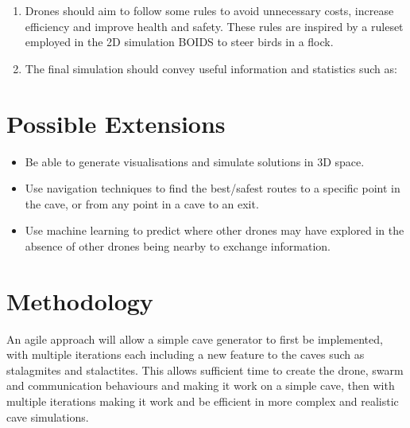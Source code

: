 \documentclass[12pt]{article}
\begin{document}
\begin{enumerate}
    \item Drones should aim to follow some rules to avoid unnecessary costs, increase efficiency and improve health and safety. These rules are inspired by a ruleset employed in the 2D simulation BOIDS to steer birds in a flock.
    
    \item The final simulation should convey useful information and statistics such as:
    
\end{enumerate}


\section{Possible Extensions}

\begin{itemize}
    \item Be able to generate visualisations and simulate solutions in 3D space.
    \item Use navigation techniques to find the best/safest routes to a specific point in the cave, or from any point in a cave to an exit.
    \item Use machine learning to predict where other drones may have explored in the absence of other drones being nearby to exchange information.
\end{itemize}

\section{Methodology}
An agile approach will allow a simple cave generator to first be implemented, with multiple iterations each including a new feature to the caves such as stalagmites and stalactites. This allows sufficient time to create the drone, swarm and communication behaviours and making it work on a simple cave, then with multiple iterations making it work and be efficient in more complex and realistic cave simulations.
\end{document}
